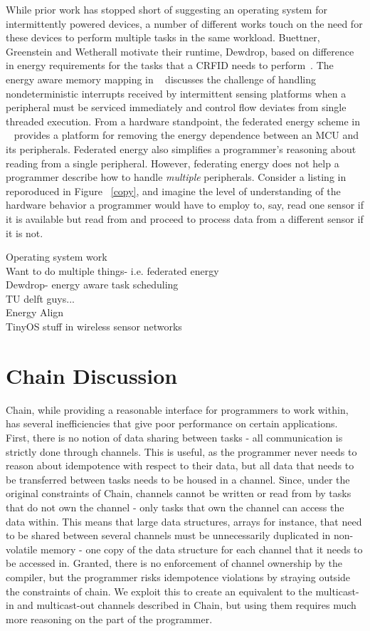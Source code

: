 \documentclass[11pt]{sensys-proc}
\newcommand{\chain}{Chain\xspace}
\begin{document}
While prior work has stopped short of suggesting an operating system for intermittently
powered devices, a number of different works touch on the need for these devices to
perform multiple tasks in the same workload. Buettner, Greenstein and Wetherall motivate
their runtime, Dewdrop, based on difference in energy requirements for the tasks that a
CRFID needs to perform~\cite{dewdrop}. The energy aware memory mapping in ~\cite{Aware}
discusses the challenge of handling nondeterministic interrupts received by intermittent
sensing platforms when a peripheral must be serviced immediately and control flow deviates
from single threaded execution. From a hardware standpoint, the federated energy scheme in
~\cite{ufop} provides a platform for removing the energy dependence between an MCU and its
peripherals. Federated energy also simplifies a programmer's reasoning about reading from
a single peripheral. However, federating energy does not help a programmer describe how to
handle {\em multiple} peripherals. Consider a listing in
~\cite{ufop} reporoduced in Figure ~\ref{copy}, and imagine the level of understanding
of the hardware behavior a programmer would have to employ to, say, read one sensor if it
is available but read from and proceed to process data from a different sensor if it is not. 

Operating system work\\
Want to do multiple things- i.e. federated energy \\
Dewdrop- energy aware task scheduling\\
TU delft guys...\\
Energy Align\\
TinyOS stuff in wireless sensor networks\\

\section{Chain Discussion}
\chain, while providing a reasonable interface for programmers to work within,
has several inefficiencies that give poor performance on certain applications.
First, there is no notion of data sharing between tasks - all communication is
strictly done through channels. This is useful, as the programmer never needs
to reason about idempotence with respect to their data, but all data that needs
to be transferred between tasks needs to be housed in a channel. Since, under
the original constraints of \chain, channels cannot be written or read from by
tasks that do not own the channel - only tasks that own the channel can access
the data within. This means that large data structures, arrays for instance,
that need to be shared between several channels must be unnecessarily
duplicated in non-volatile memory - one copy of the data structure for each
channel that it needs to be accessed in. Granted, there is no enforcement of
channel ownership by the compiler, but the programmer risks idempotence
violations by straying outside the constraints of chain. We exploit this to
create an equivalent to the multicast-in and multicast-out channels described
in \chain, but using them requires much more reasoning on the part of the programmer.
\end{document}
